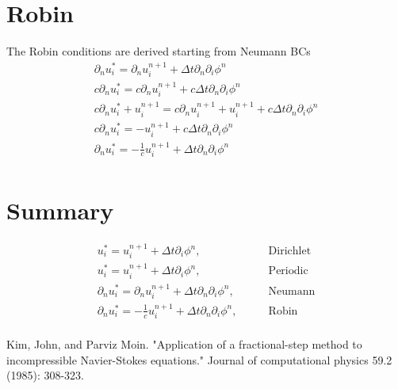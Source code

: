 \documentclass[landscape]{article}
\newcommand{\PD}{\partial}
\begin{document}
\section{Robin}
The Robin conditions are derived starting from Neumann BCs
\begin{equation}\begin{aligned}
  \PD_n u_i^* = \PD_n u_i^{n+1} + \Delta t \PD_n \PD_i \phi^n \\
  c \PD_n u_i^* = c \PD_n u_i^{n+1} + c \Delta t \PD_n \PD_i \phi^n \\
  c \PD_n u_i^* + u_i^{n+1} = c \PD_n u_i^{n+1} + u_i^{n+1} + c \Delta t \PD_n \PD_i \phi^n \\
  c \PD_n u_i^* = - u_i^{n+1} + c \Delta t \PD_n \PD_i \phi^n \\
  \PD_n u_i^* = -\frac{1}{c} u_i^{n+1} + \Delta t \PD_n \PD_i \phi^n \\
\end{aligned}\end{equation}
\section{Summary}
\begin{equation}\begin{aligned}
  u_i^* = u_i^{n+1} + \Delta t \PD_i \phi^n, \qquad & \text{Dirichlet} \\
  u_i^* = u_i^{n+1} + \Delta t \PD_i \phi^n, \qquad & \text{Periodic} \\
  \PD_n u_i^* = \PD_n u_i^{n+1} + \Delta t \PD_n \PD_i \phi^n, \qquad & \text{Neumann} \\
  \PD_n u_i^* = -\frac{1}{c} u_i^{n+1} + \Delta t \PD_n \PD_i \phi^n, \qquad & \text{Robin} \\
\end{aligned}\end{equation}

\begin{thebibliography}{1}
 Kim, John, and Parviz Moin. "Application of a fractional-step method to incompressible Navier-Stokes equations." Journal of computational physics 59.2 (1985): 308-323.
\end{thebibliography}
\end{document}
